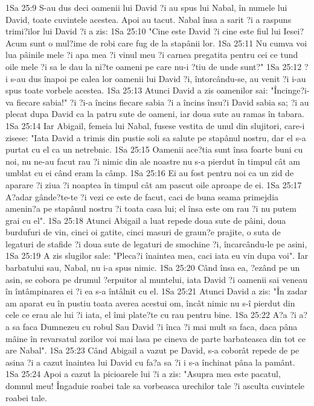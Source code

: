 1Sa 25:9  S-au dus deci oamenii lui David ?i au spus lui Nabal, în numele lui David, toate cuvintele acestea. Apoi au tacut. Nabal însa a sarit ?i a raspuns trimi?ilor lui David ?i a zis:
1Sa 25:10  "Cine este David ?i cine este fiul lui Iesei? Acum sunt o mul?ime de robi care fug de la stapânii lor.
1Sa 25:11  Nu cumva voi lua pâinile mele ?i apa mea ?i vinul meu ?i carnea pregatita pentru cei ce tund oile mele ?i sa le dau la ni?te oameni pe care nu-i ?tiu de unde sunt?"
1Sa 25:12  ?i s-au dus înapoi pe calea lor oamenii lui David ?i, întorcându-se, au venit ?i i-au spus toate vorbele acestea.
1Sa 25:13  Atunci David a zis oamenilor sai: "Încinge?i-va fiecare sabia!" ?i ?i-a încins fiecare sabia ?i a încins însu?i David sabia sa; ?i au plecat dupa David ca la patru sute de oameni, iar doua sute au ramas în tabara.
1Sa 25:14  Iar Abigail, femeia lui Nabal, fusese vestita de unul din slujitori, care-i zisese: "Iata David a trimis din pustie soli sa salute pe stapânul nostru, dar el s-a purtat cu el ca un netrebnic.
1Sa 25:15  Oamenii ace?tia sunt însa foarte buni cu noi, nu ne-au facut rau ?i nimic din ale noastre nu s-a pierdut în timpul cât am umblat cu ei când eram la câmp.
1Sa 25:16  Ei au fost pentru noi ca un zid de aparare ?i ziua ?i noaptea în timpul cât am pascut oile aproape de ei.
1Sa 25:17  A?adar gânde?te-te ?i vezi ce este de facut, caci de buna seama primejdia amenin?a pe stapânul nostru ?i toata casa lui; el însa este om rau ?i nu putem grai cu el".
1Sa 25:18  Atunci Abigail a luat repede doua sute de pâini, doua burdufuri de vin, cinci oi gatite, cinci masuri de graun?e prajite, o suta de legaturi de stafide ?i doua sute de legaturi de smochine ?i, încarcându-le pe asini,
1Sa 25:19  A zis slugilor sale: "Pleca?i înaintea mea, caci iata eu vin dupa voi". Iar barbatului sau, Nabal, nu i-a spus nimic.
1Sa 25:20  Când însa ea, ?ezând pe un asin, se cobora pe drumul ?erpuitor al muntelui, iata David ?i oamenii sai veneau în întâmpinarea ei ?i ea s-a întâlnit cu el.
1Sa 25:21  Atunci David a zis: "În zadar am aparat eu în pustiu toata averea acestui om, încât nimic nu s-î pierdut din cele ce erau ale lui ?i iata, el îmi plate?te cu rau pentru bine.
1Sa 25:22  A?a ?i a?a sa faca Dumnezeu cu robul Sau David ?i înca ?i mai mult sa faca, daca pâna mâine în revarsatul zorilor voi mai lasa pe cineva de parte barbateasca din tot ce are Nabal".
1Sa 25:23  Când Abigail a vazut pe David, s-a coborât repede de pe asina ?i a cazut înaintea lui David cu fa?a sa ?i i s-a închinat pâna la pamânt.
1Sa 25:24  Apoi a cazut la picioarele lui ?i a zis: "Asupra mea este pacatul, domnul meu! Îngaduie roabei tale sa vorbeasca urechilor tale ?i asculta cuvintele roabei tale.
